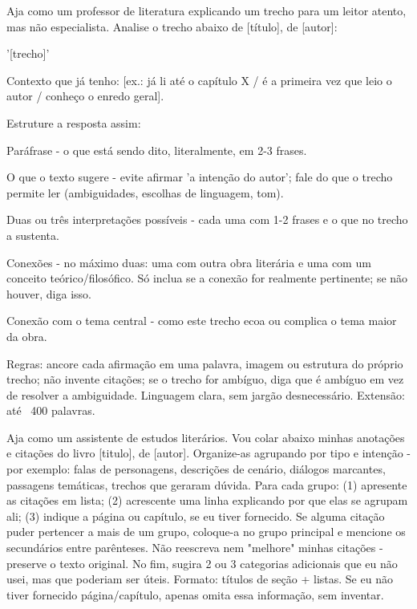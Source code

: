 \documentclass[11pt, a4paper]{article}
\begin{document}
\begin{promptbox}
Aja como um professor de literatura explicando um trecho para um leitor atento, mas não especialista. Analise o trecho abaixo de [título], de [autor]:

'[trecho]'

Contexto que já tenho: [ex.: já li até o capítulo X / é a primeira vez que leio o autor / conheço o enredo geral].

Estruture a resposta assim:

Paráfrase - o que está sendo dito, literalmente, em 2-3 frases.

O que o texto sugere - evite afirmar 'a intenção do autor'; fale do que o trecho permite ler (ambiguidades, escolhas de linguagem, tom).

Duas ou três interpretações possíveis - cada uma com 1-2 frases e o que no trecho a sustenta.

Conexões - no máximo duas: uma com outra obra literária e uma com um conceito teórico/filosófico. Só inclua se a conexão for realmente pertinente; se não houver, diga isso.

Conexão com o tema central - como este trecho ecoa ou complica o tema maior da obra.

Regras: ancore cada afirmação em uma palavra, imagem ou estrutura do próprio trecho; não invente citações; se o trecho for ambíguo, diga que é ambíguo em vez de resolver a ambiguidade. Linguagem clara, sem jargão desnecessário. Extensão: até ~400 palavras.
\end{promptbox}

\begin{promptbox}
Aja como um assistente de estudos literários. Vou colar abaixo minhas anotações e citações do livro [titulo], de [autor]. Organize-as agrupando por tipo e intenção - por exemplo: falas de personagens, descrições de cenário, diálogos marcantes, passagens temáticas, trechos que geraram dúvida. Para cada grupo: (1) apresente as citações em lista; (2) acrescente uma linha explicando por que elas se agrupam ali; (3) indique a página ou capítulo, se eu tiver fornecido. Se alguma citação puder pertencer a mais de um grupo, coloque-a no grupo principal e mencione os secundários entre parênteses. Não reescreva nem "melhore" minhas citações - preserve o texto original. No fim, sugira 2 ou 3 categorias adicionais que eu não usei, mas que poderiam ser úteis. Formato: títulos de seção + listas. Se eu não tiver fornecido página/capítulo, apenas omita essa informação, sem inventar.
\end{promptbox}
\end{document}
